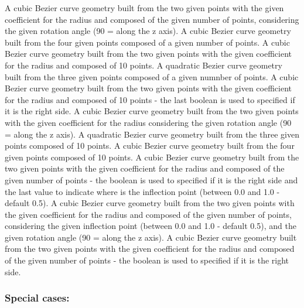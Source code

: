 \documentclass[]{book}
\theoremstyle{definition}
\theoremstyle{definition}
\theoremstyle{definition}
\theoremstyle{remark}
\begin{document}
A cubic Bezier curve geometry built from the two given points with the
given coefficient for the radius and composed of the given number of
points, considering the given rotation angle (90 = along the z axis). A
cubic Bezier curve geometry built from the four given points composed of
a given number of points. A cubic Bezier curve geometry built from the
two given points with the given coefficient for the radius and composed
of 10 points. A quadratic Bezier curve geometry built from the three
given points composed of a given numnber of points. A cubic Bezier curve
geometry built from the two given points with the given coefficient for
the radius and composed of 10 points - the last boolean is used to
specified if it is the right side. A cubic Bezier curve geometry built
from the two given points with the given coefficient for the radius
considering the given rotation angle (90 = along the z axis). A
quadratic Bezier curve geometry built from the three given points
composed of 10 points. A cubic Bezier curve geometry built from the four
given points composed of 10 points. A cubic Bezier curve geometry built
from the two given points with the given coefficient for the radius and
composed of the given number of points - the boolean is used to
specified if it is the right side and the last value to indicate where
is the inflection point (between 0.0 and 1.0 - default 0.5). A cubic
Bezier curve geometry built from the two given points with the given
coefficient for the radius and composed of the given number of points,
considering the given inflection point (between 0.0 and 1.0 - default
0.5), and the given rotation angle (90 = along the z axis). A cubic
Bezier curve geometry built from the two given points with the given
coefficient for the radius and composed of the given number of points -
the boolean is used to specified if it is the right side.

\subsubsection{Special cases:}\label{special-cases-47}
\end{document}
